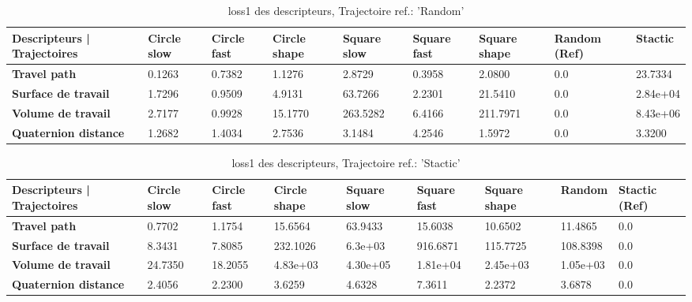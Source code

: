 \documentclass[5pt]{article}
\begin{document}
\begin{table}[H]
    \centering
    \begin{tabularx}{\textwidth}{|p{}|X|X|X|X|X|X|X|X|}
    \rowcolor{lightgray}
        \hline
        Descripteurs | Trajectoires &  Circle slow & Circle fast  &  Circle shape  & Square slow & Square fast & Square shape & \cellcolor[HTML]{238CCC} \textbf{Random (Ref)} & Stactic \\ \hline
        \textbf{Travel path} & 0.1263 & 0.7382 & 1.1276 & 2.8729 & 0.3958 & 2.0800 & 0.0 & 23.7334 \\ \hline
        \textbf{Surface de travail} & 1.7296 & 0.9509 & 4.9131 & 63.7266 & 2.2301 & 21.5410 & 0.0 & 2.84e+04 \\ \hline
        \textbf{Volume de travail} & 2.7177 & 0.9928 & 15.1770 & 263.5282 & 6.4166 & 211.7971 & 0.0 & 8.43e+06 \\ \hline
        \textbf{Quaternion distance} & 1.2682 & 1.4034 & 2.7536 & 3.1484 & 4.2546 & 1.5972 & 0.0 & 3.3200 \\ \hline  
    \end{tabularx}
    \caption{loss1 des descripteurs, Trajectoire ref.: 'Random'}
\end{table}

\begin{table}[H]
    \centering
    \begin{tabularx}{\textwidth}{|p{}|X|X|X|X|X|X|X|X|}
    \rowcolor{lightgray}
        \hline
        Descripteurs | Trajectoires &  Circle slow & Circle fast  &  Circle shape  & Square slow & Square fast & Square shape & Random  & \cellcolor[HTML]{238CCC} \textbf{Stactic (Ref)} \\ \hline
        \textbf{Travel path} & 0.7702 & 1.1754 & 15.6564 & 63.9433 & 15.6038 & 10.6502 & 11.4865 & 0.0 \\ \hline
        \textbf{Surface de travail} & 8.3431 & 7.8085 & 232.1026 & 6.3e+03 & 916.6871 & 115.7725 & 108.8398 & 0.0 \\ \hline
        \textbf{Volume de travail} & 24.7350 & 18.2055 & 4.83e+03 & 4.30e+05 & 1.81e+04 & 2.45e+03 & 1.05e+03 & 0.0 \\ \hline
        \textbf{Quaternion distance} & 2.4056 & 2.2300 & 3.6259 & 4.6328 & 7.3611 & 2.2372 & 3.6878 & 0.0 \\ \hline  
    \end{tabularx}
    \caption{loss1 des descripteurs, Trajectoire ref.: 'Stactic'}
\end{table}
\end{document}
